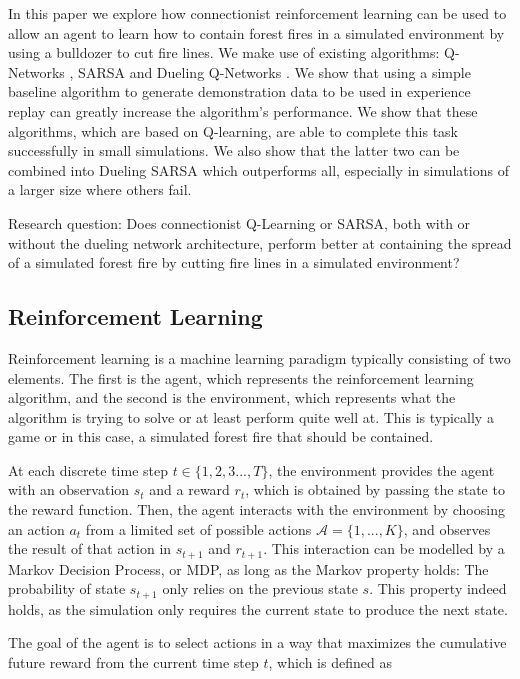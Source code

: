 In this paper we explore how connectionist reinforcement learning can be used to allow an agent to learn how to contain forest fires in a simulated environment by using a bulldozer to cut fire lines. We make use of existing algorithms: Q-Networks \citep{watkins1989learning}, SARSA \citep{rummery1994line} and Dueling Q-Networks \citep{wang2015dueling}. We show that using a simple baseline algorithm to generate demonstration data to be used in experience replay can greatly increase the algorithm's performance. We show that these algorithms, which are based on Q-learning, are able to complete this task successfully in small simulations. We also show that the latter two can be combined into Dueling SARSA which outperforms all, especially in simulations of a larger size where others fail.

Research question: Does connectionist Q-Learning or SARSA, both with or without the dueling network architecture, perform better at containing the spread of a simulated forest fire by cutting fire lines in a simulated environment?

\subsection{Reinforcement Learning}\label{sec:reinforcementlearning}
Reinforcement learning is a machine learning paradigm typically consisting of two elements. The first is the agent, which represents the reinforcement learning algorithm, and the second is the environment, which represents what the algorithm is trying to solve or at least perform quite well at. This is typically a game or in this case, a simulated forest fire that should be contained.

At each discrete time step $t \in \{1,2,3...,T\}$, the environment provides the agent with an observation $s_t$ and a reward $r_t$, which is obtained by passing the state to the reward function. Then, the agent interacts with the environment by choosing an action $a_t$ from a limited set of possible actions $\mathcal{A}=\{1,...,K\}$, and observes the result of that action in $s_{t+1}$ and $r_{t+1}$. This interaction can be modelled by a Markov Decision Process, or MDP, as long as the Markov property holds: The probability of state $s_{t+1}$ only relies on the previous state $s$. This property indeed holds, as the simulation only requires the current state to produce the next state.

The goal of the agent is to select actions in a way that maximizes the cumulative future reward from the current time step $t$, which is defined as 

